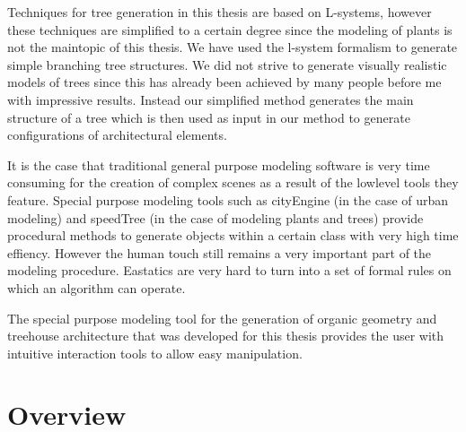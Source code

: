 
Techniques for tree generation in this thesis are based on L-systems, however these techniques are simplified to a certain degree since the modeling of plants is not the maintopic of this thesis. We have used the l-system formalism to generate simple branching tree structures. We did not strive to generate visually realistic models of trees since this has already been achieved by many people before me with impressive results. Instead our simplified method generates the main structure of a tree which is then used as input in our method to generate configurations of architectural elements. 


It is the case that traditional general purpose modeling software is very time consuming for the creation of complex scenes as a result of the lowlevel tools they feature. Special purpose modeling tools such as cityEngine \citep{Muller06} (in the case of urban modeling) and speedTree (in the case of modeling plants and trees) provide procedural methods to generate objects within a certain class with very high time effiency. However the human touch still remains a very important part of the modeling procedure. Eastatics are very hard to turn into a set of formal rules on which an algorithm can operate.

The special purpose modeling tool for the generation of organic geometry and treehouse architecture that was developed for this thesis provides the user with intuitive interaction tools to allow easy manipulation.        



\section{Overview}
\label{subsec:overview}

